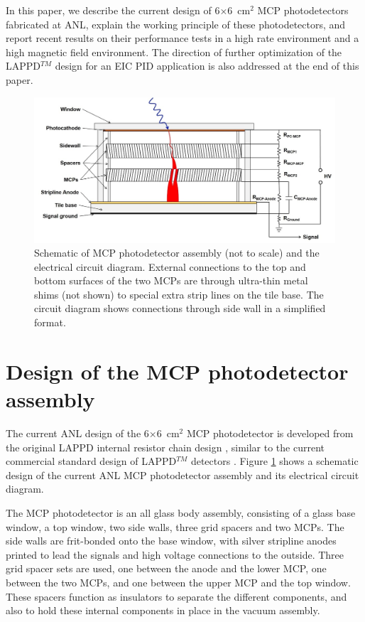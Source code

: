 \documentclass[preprint,5p]{elsarticle}
\begin{document}
In this paper, we describe the current design of 6$\times$6~cm$^2$ MCP 
photodetectors fabricated at ANL, explain the working principle of these 
photodetectors, and report recent results on their performance tests in a high 
rate environment and a high magnetic field environment. The direction of 
further optimization of the LAPPD$^{TM}$ design for an EIC PID application is 
also addressed at the end of this paper.

\begin{figure}[tbp]
\centering \includegraphics[scale=0.3]{fig/MCPs_design.png}
\caption{Schematic of MCP photodetector assembly (not to scale) and the 
   electrical circuit diagram. External connections to the top and bottom 
surfaces of the two MCPs are through ultra-thin metal shims (not shown) to 
special extra strip lines on the tile base. The circuit diagram shows 
connections through side wall in a simplified format.} 
\label{fig:design}
\end{figure}

\section{Design of the MCP photodetector assembly} \label{sec_design}
The current ANL design of the 6$\times$6~cm$^2$ MCP photodetector is developed 
from the original LAPPD internal resistor chain design \cite{Wang-MCPs2}, 
similar to the current commercial standard design of LAPPD$^{TM}$ detectors 
\cite{Craven-MCPs}. Figure \ref{fig:design} shows a schematic design of the 
current ANL MCP photodetector assembly and its electrical circuit diagram.  

The MCP photodetector is an all glass body assembly, consisting of a glass base 
window, a top window, two side walls, three grid spacers and two MCPs. The side 
walls are frit-bonded onto the base window, with silver stripline anodes 
printed to lead the signals and high voltage connections to the outside. Three 
grid spacer sets are used, one between the anode and the lower MCP, one between 
the two MCPs, and one between the upper MCP and the top window. These spacers 
function as insulators to separate the different components, and also to hold 
these internal components in place in the vacuum assembly. 
\end{document}
